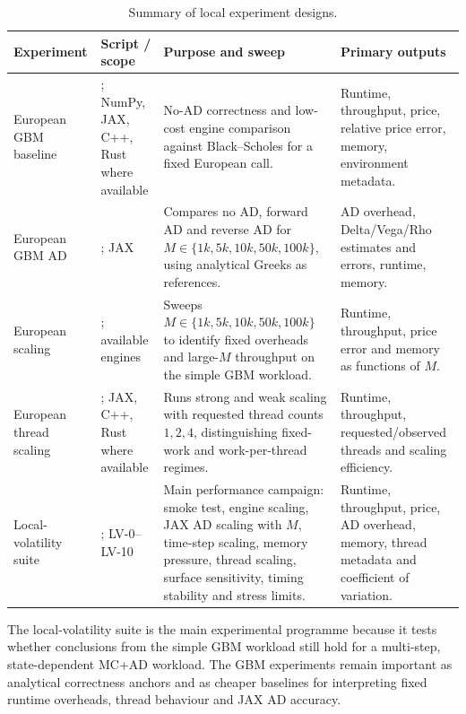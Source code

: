 \begin{table}[htbp]
\centering
\footnotesize
\caption{Summary of local experiment designs.}
\label{tab:exp-design-summary}
\begin{tabularx}{\textwidth}{p{}p{}Y p{0.22\textwidth}}
\toprule
\textbf{Experiment} &
\textbf{Script / scope} &
\textbf{Purpose and sweep} &
\textbf{Primary outputs} \\
\midrule
European GBM baseline &
; NumPy, JAX, C++, Rust where available &
No-AD correctness and low-cost engine comparison against Black--Scholes for a fixed European call. &
Runtime, throughput, price, relative price error, memory, environment metadata. \\

European GBM AD &
; JAX &
Compares no AD, forward AD and reverse AD for
\(M\in\{1k,5k,10k,50k,100k\}\), using analytical Greeks as references. &
AD overhead, Delta/Vega/Rho estimates and errors, runtime, memory. \\

European scaling &
; available engines &
Sweeps \(M\in\{1k,5k,10k,50k,100k\}\) to identify fixed overheads and large-\(M\) throughput on the simple GBM workload. &
Runtime, throughput, price error and memory as functions of \(M\). \\

European thread scaling &
; JAX, C++, Rust where available &
Runs strong and weak scaling with requested thread counts \(1,2,4\), distinguishing fixed-work and work-per-thread regimes. &
Runtime, throughput, requested/observed threads and scaling efficiency. \\

Local-volatility suite &
; LV-0--LV-10 &
Main performance campaign: smoke test, engine scaling, JAX AD scaling with \(M\), time-step scaling, memory pressure, thread scaling, surface sensitivity, timing stability and stress limits. &
Runtime, throughput, price, AD overhead, memory, thread metadata and coefficient of variation. \\
\bottomrule
\end{tabularx}
\end{table}

The local-volatility suite is the main experimental programme because it tests
whether conclusions from the simple GBM workload still hold for a multi-step,
state-dependent MC+AD workload. The GBM experiments remain important as
analytical correctness anchors and as cheaper baselines for interpreting fixed
runtime overheads, thread behaviour and JAX AD accuracy.

